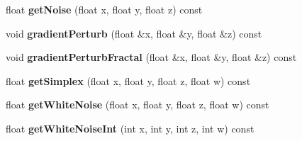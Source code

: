\begin{DoxyCompactItemize}
float {\bfseries get\+Noise} (float x, float y, float z) const
\item 
\mbox{\label{classnoisefast_afaa268767862837dc232aa4f52c402c5}} 
void {\bfseries gradient\+Perturb} (float \&x, float \&y, float \&z) const
\item 
\mbox{\label{classnoisefast_a53ee51c22d3e7e0293ba1130bf71adbd}} 
void {\bfseries gradient\+Perturb\+Fractal} (float \&x, float \&y, float \&z) const
\item 
\mbox{\label{classnoisefast_a2a7776874064d49a4840d1ed41efa325}} 
float {\bfseries get\+Simplex} (float x, float y, float z, float w) const
\item 
\mbox{\label{classnoisefast_a5600185f3388f0d2eb38c44173d30678}} 
float {\bfseries get\+White\+Noise} (float x, float y, float z, float w) const
\item 
\mbox{\label{classnoisefast_a649c81426e85bd0e3c7ff90fe06c6397}} 
float {\bfseries get\+White\+Noise\+Int} (int x, int y, int z, int w) const
\end{DoxyCompactItemize}

